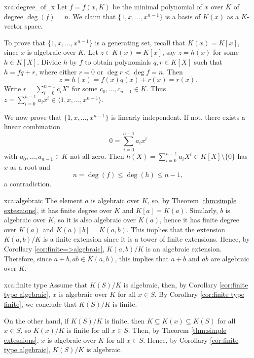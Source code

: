 \begin{sol}{xca:degree_of_x}
    Let $f=f(x,K)$ be the minimal polynomial of $x$ over $K$ of degree $\deg(f)=n$.
    We claim that $\{1,x,\dots, x^{n-1}\}$ is a basis of $K(x)$ as a $K$-vector space. 

    To prove that $\{1,x,\dots, x^{n-1}\}$ is a generating set, recall that $K(x)=K[x]$, since $x$ is algebraic over $K$. 
    Let $z\in K(x)=K[x]$, say $z=h(x)$ for some $h\in K[X]$. 
    Divide $h$ by $f$ to obtain polynomials $q,r\in K[X]$ 
    such that $h=fq+r$, where either $r=0$ or $\deg r<\deg f=n$. Then 
    \[
		z=h(x)=f(x)q(x)+r(x)=r(x).
	\]
	Write $r=\sum_{i=0}^{n-1}c_iX^i$ for some $c_0,\dots,c_{n-1}\in K$. 
    Thus $z=\sum_{i=0}^{n-1}a_ix^i\in \langle 1,x,\dots,x^{n-1}\rangle$.
        
    We now prove that $\{1,x,\dots, x^{n-1}\}$ is linearly independent. If not, 
    there exists a linear combination
    \[
    0=\sum_{i=0}^{n-1}a_ix^i
    \]
    with $a_0,\dots,a_{n-1}\in K$ not all zero. 
    Then $h(X)=\sum_{i=0}^{n-1}a_iX^i\in K[X]\setminus\{0\}$
    has $x$ as a root and 
        \[
        n=\deg(f)\leq \deg(h)\leq n-1,
        \]
       a contradiction. 
\end{sol}

\begin{sol}{xca:algebraic}
The element $a$ is algebraic over $K$, 
so, by Theorem \ref{thm:simple extesnions},
it has finite degree over $K$
and $K[a]=K(a)$.
Similarly, $b$ is algebraic over $K$,
so it is also algebraic over $K(a)$, hence it has finite degree over $K(a)$ and 
$K(a)[b]=K(a,b)$.
This implies that the extension
$K(a,b)/K$ is a finite extension
since it is a tower of finite extensions.
Hence, by Corollary \ref{cor:finite=>algebraic}, $K(a,b)/K$ is an algebraic extension.
Therefore, since $a+b,ab\in K(a,b)$,
this implies that $a+b$ and $ab$
are algebraic over $K$.
\end{sol}

\begin{sol}{xca:finite type}
    Assume that $K(S)/K$ is algebraic, then, by Corollary \ref{cor:finite type algebraic}, 
    $x$ is algebraic over $K$ for all $x\in S$.
    By Corollary \ref{cor:finite type finite}, we conclude that $K(S)/K$ is finite.

    On the other hand, if $K(S)/K$ is finite, then
    $K\subseteq K(x)\subseteq K(S)$ for all $x\in S$, so
    $K(x)/K$ is finite for all $x\in S$.
    Then, by Theorem \ref{thm:simple extesnions},
    $x$ is algebraic over $K$ for all $x\in S$.
    Hence, by Corollary \ref{cor:finite type algebraic}, $K(S)/K$ is algebraic.
 \end{sol}

